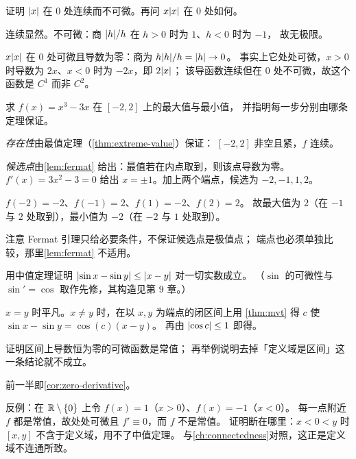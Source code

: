 \begin{exercise}[例行]
  \label{exr:abs-not-diff}
  证明 \(\lvert x\rvert\) 在 \(0\) 处连续而不可微。再问 \(x\lvert x\rvert\) 在 \(0\) 处如何。
  \begin{solution}
    连续显然。不可微：商 \(\lvert h\rvert/h\) 在 \(h>0\) 时为 \(1\)、\(h<0\) 时为 \(-1\)，
    故无极限。

    \(x\lvert x\rvert\) 在 \(0\) 处可微且导数为零：商为 \(h\lvert h\rvert/h = \lvert h\rvert \to 0\)。
    事实上它处处可微，\(x>0\) 时导数为 \(2x\)、\(x<0\) 时为 \(-2x\)，即 \(2\lvert x\rvert\)；
    该导函数连续但在 \(0\) 处不可微，故这个函数是 \(C^{1}\) 而非 \(C^{2}\)。
  \end{solution}
\end{exercise}

\begin{exercise}[例行]
  \label{exr:extremes-cubic}
  求 \(f(x)=x^{3}-3x\) 在 \([-2,2]\) 上的最大值与最小值，
  并指明每一步分别由哪条定理保证。
  \begin{solution}
    \emph{存在性}由最值定理（\cref{thm:extreme-value}）保证：
    \([-2,2]\) 非空且紧，\(f\) 连续。

    \emph{候选点}由\cref{lem:fermat} 给出：最值若在内点取到，则该点导数为零。
    \(f'(x)=3x^{2}-3=0\) 给出 \(x=\pm1\)。加上两个端点，候选为 \(-2,-1,1,2\)。

    \(f(-2)=-2\)、\(f(-1)=2\)、\(f(1)=-2\)、\(f(2)=2\)。
    故最大值为 \(2\)（在 \(-1\) 与 \(2\) 处取到），最小值为 \(-2\)（在 \(-2\) 与 \(1\) 处取到）。

    注意 Fermat 引理只给必要条件，不保证候选点是极值点；
    端点也必须单独比较，那里\cref{lem:fermat} 不适用。
  \end{solution}
\end{exercise}

\begin{exercise}[例行]
  \label{exr:sin-lipschitz}
  用中值定理证明 \(\lvert\sin x - \sin y\rvert \le \lvert x-y\rvert\) 对一切实数成立。
  （\(\sin\) 的可微性与 \(\sin'=\cos\) 取作先修，其构造见第 9 章。）
  \begin{solution}
    \(x=y\) 时平凡。\(x \neq y\) 时，在以 \(x,y\) 为端点的闭区间上用%
    \cref{thm:mvt} 得 \(c\) 使 \(\sin x - \sin y = \cos(c)(x-y)\)。
    再由 \(\lvert\cos c\rvert \le 1\) 即得。
  \end{solution}
\end{exercise}

\begin{exercise}[例行]
  \label{exr:zero-derivative-interval}
  证明区间上导数恒为零的可微函数是常值；
  再举例说明去掉「定义域是区间」这一条结论就不成立。
  \begin{solution}
    前一半即\cref{cor:zero-derivative}。

    反例：在 \(\mathbb{R} \setminus \left\{0\right\}\) 上令 \(f(x)=1\)（\(x>0\)）、\(f(x)=-1\)（\(x<0\)）。
    每一点附近 \(f\) 都是常值，故处处可微且 \(f' \equiv 0\)，而 \(f\) 不是常值。
    证明断在哪里：\(x<0<y\) 时 \([x,y]\) 不含于定义域，用不了中值定理。
    与\cref{ch:connectedness}对照，这正是定义域不连通所致。
  \end{solution}
\end{exercise}

